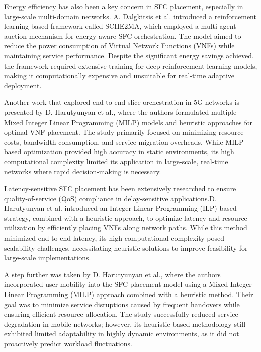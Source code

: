 \documentclass[conference]{IEEEtran}
\begin{document}
	Energy efficiency has also been a key concern in SFC placement, especially in large-scale multi-domain networks. A. Dalgkitsis et al. introduced a reinforcement learning-based framework called SCHE2MA, which employed a multi-agent auction mechanism for energy-aware SFC orchestration. The model aimed to reduce the power consumption of Virtual Network Functions (VNFs) while maintaining service performance. Despite the significant energy savings achieved, the framework required extensive training for deep reinforcement learning models, making it computationally expensive and unsuitable for real-time adaptive deployment.
	
	Another work that explored end-to-end slice orchestration in 5G networks is presented by D. Harutyunyan et al., where the authors formulated multiple Mixed Integer Linear Programming (MILP) models and heuristic approaches for optimal VNF placement. The study primarily focused on minimizing resource costs, bandwidth consumption, and service migration overheads. While MILP-based optimization provided high accuracy in static environments, its high computational complexity limited its application in large-scale, real-time networks where rapid decision-making is necessary.
	
	Latency-sensitive SFC placement has been extensively researched to ensure quality-of-service (QoS) compliance in delay-sensitive applications.D.  Harutyunyan et al. introduced an Integer Linear Programming (ILP)-based strategy, combined with a heuristic approach, to optimize latency and resource utilization by efficiently placing VNFs along network paths. While this method minimized end-to-end latency, its high computational complexity posed scalability challenges, necessitating heuristic solutions to improve feasibility for large-scale implementations.
	
	A step further was taken by D.  Harutyunyan et al., where the authors incorporated user mobility into the SFC placement model using a Mixed Integer Linear Programming (MILP) approach combined with a heuristic method. Their goal was to minimize service disruptions caused by frequent handovers while ensuring efficient resource allocation. The study successfully reduced service degradation in mobile networks; however, its heuristic-based methodology still exhibited limited adaptability in highly dynamic environments, as it did not proactively predict workload fluctuations.
	
\end{document}
